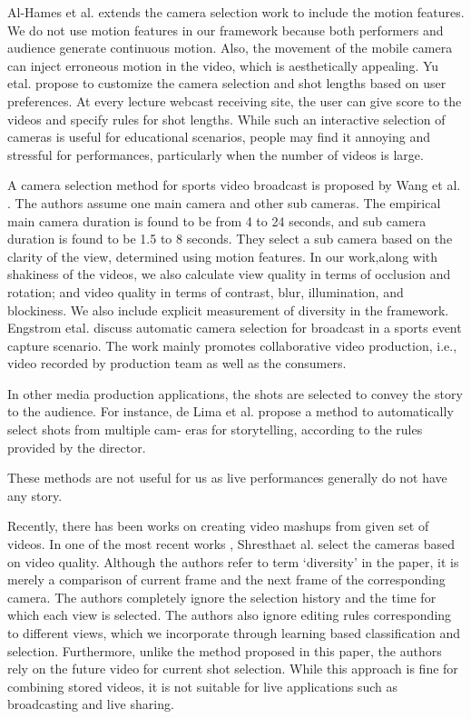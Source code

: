 \documentclass{sig-alternate}
\begin{document}
Al-Hames et al. \cite{3} extends the camera selection work to include the motion features. We do not use motion features in our framework because both performers and audience generate continuous motion. Also, the movement of the mobile camera can inject erroneous motion in the video, which is aesthetically appealing. Yu etal. \cite{20} propose to customize the camera selection and shot lengths based on user preferences. At every lecture webcast receiving site, the user can give score to the videos and specify rules for shot lengths. While such an interactive selection of cameras is useful for educational scenarios, people may find it annoying and stressful for performances, particularly when the number of videos is large.

A camera selection method for sports video broadcast is proposed by Wang et al. \cite{16}. The authors assume one main camera and other sub cameras. The empirical main camera duration is found to be from 4 to 24 seconds, and sub camera duration is found to be 1.5 to 8 seconds. They select a sub camera based on the clarity of the view, determined using motion features. In our work,along with shakiness of the videos, we also calculate view quality in terms of occlusion and rotation; and video quality in terms of contrast, blur, illumination, and blockiness. We also include explicit measurement of diversity in the framework. Engstrom etal. \cite{8} discuss automatic camera selection for broadcast in a sports event capture scenario. The work mainly promotes collaborative video production, i.e., video recorded by production team as well as the consumers.

In other media production applications, the shots are selected to convey the story to the audience. For instance, de Lima et al. \cite{7} propose a method to automatically select shots from multiple cam-
eras for storytelling, according to the rules provided by the director.

These methods are not useful for us as live performances generally
do not have any story.


Recently, there has been works on creating video mashups from given set of videos. In one of the most recent works \cite{15}, Shresthaet al. select the cameras based on video quality. Although the authors refer to term ‘diversity’ in the paper, it is merely a comparison of current frame and the next frame of the corresponding camera. The authors completely ignore the selection history and the time for which each view is selected. The authors also ignore editing rules corresponding to different views, which we incorporate through learning based classification and selection. Furthermore, unlike the method proposed in this paper, the authors rely on the future video for current shot selection. While this approach is fine for combining stored videos, it is not suitable for live applications such as broadcasting and live sharing.
\end{document}
